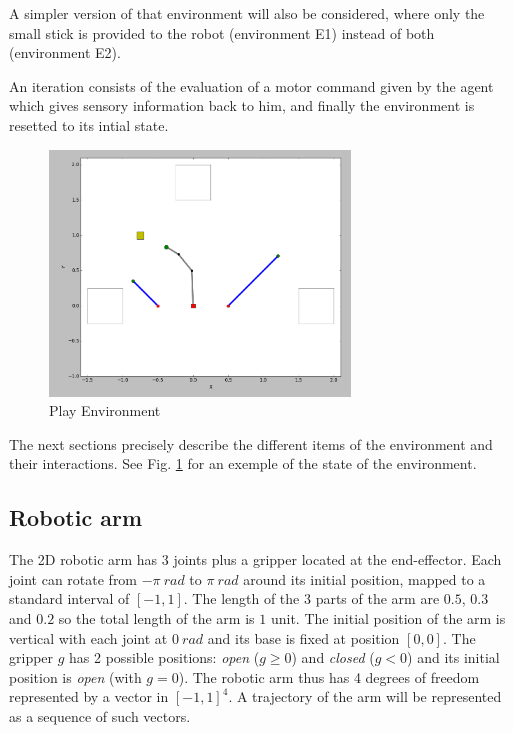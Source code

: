 \documentclass[conference]{include/IEEEtran}
\begin{document}
	A simpler version of that environment will also be considered, where only the small stick is provided to the robot (environment E1) instead of both (environment E2).
	
	An iteration consists of the evaluation of a motor command given by the agent which gives
	sensory information back to him, and 
	finally the environment is resetted to its intial state.
	
	\begin{figure}[!t]
		\centering
		\includegraphics[width=8cm]{./include/tools.png}
		\caption{Play Environment}
		\label{env}
	\end{figure}
		
	The next sections precisely describe the different items of the environment and their interactions.	
	See Fig. \ref{env} for an exemple of the state of the environment. 
	

	\subsection{Robotic arm}
	
		The 2D robotic arm has 3 joints plus a gripper located at the end-effector.
		Each joint can rotate from $-\pi~rad$ to $\pi~rad$ around its initial position, mapped to a standard interval of $[-1,1]$.
		The length of the 3 parts of the arm are $0.5$, $0.3$ and $0.2$ so the total length of the arm is $1$ unit.
		The initial position of the arm is vertical with each joint at $0~rad$ and its base is fixed at position $[0, 0]$.
		The gripper $g$ has 2 possible positions: \textit{open} ($g \geq 0$) and \textit{closed} ($g < 0$) and its initial position is \textit{open} (with $g = 0$).
		The robotic arm thus has 4 degrees of freedom represented by a vector in $[-1,1]^4$.
		A trajectory of the arm will be represented as a sequence of such vectors.
	
	
\end{document}
